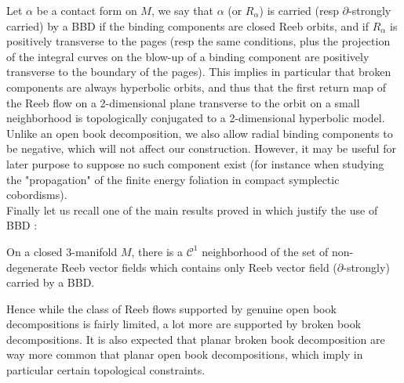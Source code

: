 \documentclass[../main.tex]{subfiles}
\begin{document}
Let $\alpha$ be a contact form on $M$, we say that $\alpha$ (or $R_\alpha$) is carried (resp $\partial$-strongly carried) by a BBD if the binding components are closed Reeb orbits, and if $R_\alpha$ is positively transverse to the pages (resp the same conditions, plus the projection of the integral curves on the blow-up of a binding component are positively transverse to the boundary of the pages). This implies in particular that broken components are always hyperbolic orbits, and thus that the first return map of the Reeb flow on a 2-dimensional plane transverse to the orbit on a small neighborhood is topologically conjugated to a 2-dimensional hyperbolic model. Unlike an open book decomposition, we also allow radial binding components to be negative, which will not affect our construction. However, it may be useful for later purpose to suppose no such component exist (for instance when studying the "propagation" of the finite energy foliation in compact symplectic cobordisms).\\

Finally let us recall one of the main results proved in \cite{colin_existence_2022} which justify the use of BBD : 
\begin{theorem}
    On a closed 3-manifold $M$, there is a $\mathcal{C}^1$ neighborhood of the set of non-degenerate Reeb vector fields which contains only Reeb vector field ($\partial$-strongly) carried by a BBD. 
\end{theorem}

Hence while the class of Reeb flows supported by genuine open book decompositions is fairly limited, a lot more are supported by broken book decompositions. It is also expected that planar broken book decomposition are way more common that planar open book decompositions, which imply in particular certain topological constraints.
\end{document}
